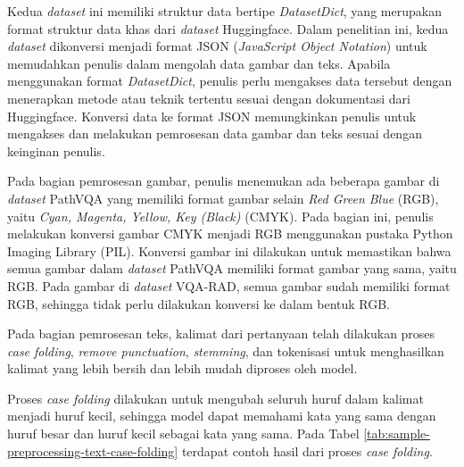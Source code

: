 Kedua \textit{dataset} ini memiliki struktur data bertipe \textit{DatasetDict}, yang merupakan format struktur data khas dari \textit{dataset} Huggingface. Dalam penelitian ini, kedua \textit{dataset} dikonversi menjadi format JSON (\textit{JavaScript Object Notation}) untuk memudahkan penulis dalam mengolah data gambar dan teks. Apabila menggunakan format \textit{DatasetDict}, penulis perlu mengakses data tersebut dengan menerapkan metode atau teknik tertentu sesuai dengan dokumentasi dari Huggingface. Konversi data ke format JSON memungkinkan penulis untuk mengakses dan melakukan pemrosesan data gambar dan teks sesuai dengan keinginan penulis.

\par Pada bagian pemrosesan gambar, penulis menemukan ada beberapa gambar di \textit{dataset} PathVQA yang memiliki format gambar selain \textit{Red Green Blue} (RGB), yaitu \textit{Cyan, Magenta, Yellow, Key (Black)} (CMYK). Pada bagian ini, penulis melakukan konversi gambar CMYK menjadi RGB menggunakan pustaka Python Imaging Library (PIL). Konversi gambar ini dilakukan untuk memastikan bahwa semua gambar dalam \textit{dataset} PathVQA memiliki format gambar yang sama, yaitu RGB. Pada gambar di \textit{dataset} VQA-RAD, semua gambar sudah memiliki format RGB, sehingga tidak perlu dilakukan konversi ke dalam bentuk RGB.

\par Pada bagian pemrosesan teks, kalimat dari pertanyaan telah dilakukan proses \textit{case folding}, \textit{remove punctuation}, \textit{stemming}, dan tokenisasi untuk menghasilkan kalimat yang lebih bersih dan lebih mudah diproses oleh model. 

\par Proses \textit{case folding} dilakukan untuk mengubah seluruh huruf dalam kalimat menjadi huruf kecil, sehingga model dapat memahami kata yang sama dengan huruf besar dan huruf kecil sebagai kata yang sama. Pada Tabel \ref{tab:sample-preprocessing-text-case-folding} terdapat contoh hasil dari proses \textit{case folding}. 

